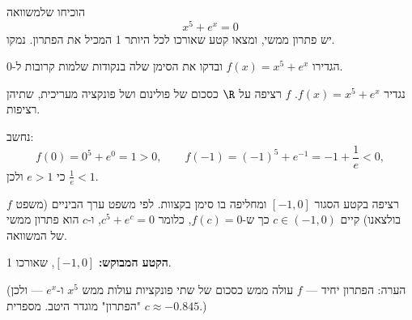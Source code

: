 
\begin{question}
הוכיחו שלמשוואה
\[
x^5+e^x=0
\]
יש פתרון ממשי, ומצאו קטע שאורכו לכל היותר 1 המכיל את הפתרון. נמקו.
\end{question}

\begin{hint}
הגדירו $f(x)=x^5+e^x$ ובדקו את הסימן שלה בנקודות שלמות קרובות ל-0.
\end{hint}

\begin{solution}
נגדיר $f(x)=x^5+e^x$. $f$ רציפה על $\R$ כסכום של פולינום ושל פונקציה מעריכית, שתיהן רציפות.

נחשב:
\[
f(0)=0^5+e^0=1>0,\qquad f(-1)=(-1)^5+e^{-1}=-1+\frac1e<0 ,
\]
כי $e>1$ ולכן $\frac1e<1$.

$f$ רציפה בקטע הסגור $[-1,0]$ ומחליפה בו סימן בקצוות. לפי משפט ערך הביניים (משפט בולצאנו) קיים $c\in(-1,0)$ כך ש-$f(c)=0$, כלומר $c^5+e^c=0$, ו-$c$ הוא פתרון ממשי של המשוואה.

\textbf{הקטע המבוקש:} $[-1,0]$, שאורכו 1.

(הערה: הפתרון יחיד — $f$ עולה ממש כסכום של שתי פונקציות עולות ממש $x^5$ ו-$e^x$ — ולכן "הפתרון" מוגדר היטב. מספרית $c\approx-0.845$.)
\end{solution}
